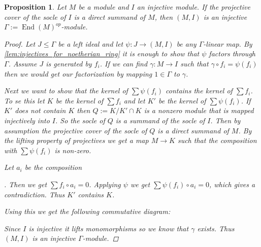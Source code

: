 \documentclass[11pt, a4paper, english]{article}
\newtheorem{prop}[theorem]{Proposition}
\theoremstyle{definition}
\DeclareMathOperator{\End}{End}
\begin{document}
\begin{prop}\label{prop:hom_generator_preserves_injectives}
	Let $M$ be a module and $I$ an injective module. If the projective cover of the socle of $I$ is a direct summand of $M$, then $(M,I)$ is an injective $\Gamma:=\End(M)^{op}$-module.
	\begin{proof}
		Let $J \leq \Gamma$ be a left ideal and let $\psi: J \to (M,I)$ be any $\Gamma$-linear map. By \cref{lem:injectives_for_noetherian_ring} it is enough to show that $\psi$ factors through $\Gamma$. Assume $J$ is generated by $f_i$. If we can find $\gamma: M \to I$ such that $\gamma \circ f_i = \psi(f_i)$ then we would get our factorization by mapping $1\in \Gamma$ to $\gamma$.
		\begin{center}
		\end{center}
		Next we want to show that the kernel of $\sum \psi(f_i)$ contains the kernel of $\sum f_i$. To se this let $K$ be the kernel of $\sum f_i$ and let $K'$ be the kernel of $\sum \psi(f_i)$. If $K'$ does not contain $K$ then $Q:= K/K'\cap K$ is a nonzero module that is mapped injectively into $I$. So the socle of $Q$ is a summand of the socle of $I$. Then by assumption the projective cover of the socle of $Q$ is a direct summand of $M$. By the lifting property of projectives we get a map $M \to K$ such that the composition with $\sum \psi(f_i)$ is non-zero.
		
		Let $a_i$ be the composition 
		.
		Then we get $\sum f_i \circ a_i = 0$. Applying $\psi$ we get $\sum \psi(f_i)\circ a_i = 0$, which gives a contradiction. Thus $K'$ contains $K$.
		
		Using this we get the following commutative diagram:
		\begin{center}
		\end{center}
		Since $I$ is injective it lifts monomorphisms so we know that $\gamma$ exists. Thus $(M, I)$ is an injective $\Gamma$-module.
	\end{proof}
\end{prop}
\end{document}
